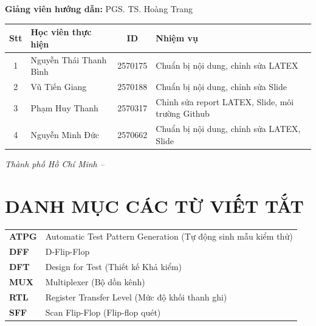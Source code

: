 \documentclass[12pt,a4paper]{article}
\begin{document}
\begin{titlepage}
    \vspace{0.3cm}
    
    {\fontsize{13}{16}\selectfont \textbf{Giảng viên hướng dẫn:} PGS. TS. Hoàng Trang}
    
    \vspace{0.8cm}
    
    \begin{center}
    \renewcommand{\arraystretch}{1.2}
    \fontsize{11}{13}\selectfont
    \begin{tabular}{|c|l|c|l|}
        \hline
        \textbf{Stt} & \textbf{Học viên thực hiện} & \textbf{ID} & \textbf{Nhiệm vụ}\\
        \hline
        1 & Nguyễn Thái Thanh Bình & 2570175 & Chuẩn bị nội dung, chỉnh sửa LATEX \\
        \hline
        2 & Vũ Tiến Giang & 2570188 & Chuẩn bị nội dung, chỉnh sửa Slide \\
        \hline
        3 & Phạm Huy Thanh & 2570317 & Chỉnh sửa report LATEX, Slide, môi trường Github \\
        \hline
        4 & Nguyễn Minh Đức & 2570662 & Chuẩn bị nội dung, chỉnh sửa LATEX, Slide\\
        \hline
    \end{tabular}
    \end{center}
    
    \vfill
    
    {\fontsize{13}{16}\selectfont \textit{Thành phố Hồ Chí Minh -- \the\year}}
    
    \vspace{0.5cm}
    
    \restoregeometry
\end{titlepage}

\newpage
\section*{DANH MỤC CÁC TỪ VIẾT TẮT}

\begin{tabular}{l l}
    \textbf{ATPG} & Automatic Test Pattern Generation (Tự động sinh mẫu kiểm thử) \\
    \textbf{DFF} & D-Flip-Flop \\
    \textbf{DFT} & Design for Test (Thiết kế Khả kiểm) \\
    \textbf{MUX} & Multiplexer (Bộ dồn kênh) \\
    \textbf{RTL} & Register Transfer Level (Mức độ khối thanh ghi) \\
    \textbf{SFF} & Scan Flip-Flop (Flip-flop quét) \\
\end{tabular}
\end{document}
